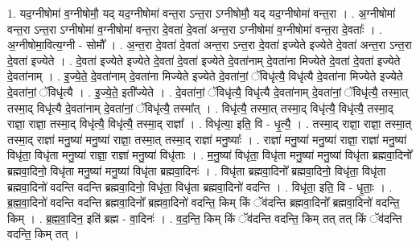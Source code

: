 \documentclass[17pt]{extarticle}
\begin{document}
1. यद॒ग्नीषोमा॑ व॒ग्नीषोमौ॒ यद् यद॒ग्नीषोमा॑ वन्त॒रा ऽन्त॒रा ऽग्नीषोमौ॒ यद् यद॒ग्नीषोमा॑ वन्त॒रा । . अ॒ग्नीषोमा॑ वन्त॒रा ऽन्त॒रा ऽग्नीषोमा॑ व॒ग्नीषोमा॑ वन्त॒रा दे॒वता॑ दे॒वता॑ अन्त॒रा ऽग्नीषोमा॑ व॒ग्नीषोमा॑ वन्त॒रा दे॒वताः᳚ । . अ॒ग्नीषोमा॒वित्य॒ग्नी - सोमौ᳚ । . अ॒न्त॒रा दे॒वता॑ दे॒वता॑ अन्त॒रा ऽन्त॒रा दे॒वता॑ इज्येते इज्येते दे॒वता॑ अन्त॒रा ऽन्त॒रा दे॒वता॑ इज्येते । . दे॒वता॑ इज्येते इज्येते दे॒वता॑ दे॒वता॑ इज्येते दे॒वता॑नाम् दे॒वता॑ना मिज्येते दे॒वता॑ दे॒वता॑ इज्येते दे॒वता॑नाम् । . इ॒ज्ये॒ते॒ दे॒वता॑नाम् दे॒वता॑ना मिज्येते इज्येते दे॒वता॑नां॒ ॅविधृ॑त्यै॒ विधृ॑त्यै दे॒वता॑ना मिज्येते इज्येते दे॒वता॑नां॒ ॅविधृ॑त्यै । . इ॒ज्ये॒ते॒ इती᳚ज्येते । . दे॒वता॑नां॒ ॅविधृ॑त्यै॒ विधृ॑त्यै दे॒वता॑नाम् दे॒वता॑नां॒ ॅविधृ॑त्यै॒ तस्मा॒त् तस्मा॒द् विधृ॑त्यै दे॒वता॑नाम् दे॒वता॑नां॒ ॅविधृ॑त्यै॒ तस्मा᳚त् । . विधृ॑त्यै॒ तस्मा॒त् तस्मा॒द् विधृ॑त्यै॒ विधृ॑त्यै॒ तस्मा॒द् राज्ञा॒ राज्ञा॒ तस्मा॒द् विधृ॑त्यै॒ विधृ॑त्यै॒ तस्मा॒द् राज्ञा᳚ । . विधृ॑त्या॒ इति॒ वि - धृ॒त्यै॒ । . तस्मा॒द् राज्ञा॒ राज्ञा॒ तस्मा॒त् तस्मा॒द् राज्ञा॑ मनु॒ष्या॑ मनु॒ष्या॑ राज्ञा॒ तस्मा॒त् तस्मा॒द् राज्ञा॑ मनु॒ष्याः᳚ । . राज्ञा॑ मनु॒ष्या॑ मनु॒ष्या॑ राज्ञा॒ राज्ञा॑ मनु॒ष्या॑ विधृ॑ता॒ विधृ॑ता मनु॒ष्या॑ राज्ञा॒ राज्ञा॑ मनु॒ष्या॑ विधृ॑ताः । . म॒नु॒ष्या॑ विधृ॑ता॒ विधृ॑ता मनु॒ष्या॑ मनु॒ष्या॑ विधृ॑ता ब्रह्मवा॒दिनो᳚ ब्रह्मवा॒दिनो॒ विधृ॑ता मनु॒ष्या॑ मनु॒ष्या॑ विधृ॑ता ब्रह्मवा॒दिनः॑ । . विधृ॑ता ब्रह्मवा॒दिनो᳚ ब्रह्मवा॒दिनो॒ विधृ॑ता॒ विधृ॑ता ब्रह्मवा॒दिनो॑ वदन्ति वदन्ति ब्रह्मवा॒दिनो॒ विधृ॑ता॒ विधृ॑ता ब्रह्मवा॒दिनो॑ वदन्ति । . विधृ॑ता॒ इति॒ वि - धृ॒ताः॒ । . ब्र॒ह्म॒वा॒दिनो॑ वदन्ति वदन्ति ब्रह्मवा॒दिनो᳚ ब्रह्मवा॒दिनो॑ वदन्ति॒ किम् किं ॅव॑दन्ति ब्रह्मवा॒दिनो᳚ ब्रह्मवा॒दिनो॑ वदन्ति॒ किम् । . ब्र॒ह्म॒वा॒दिन॒ इति॑ ब्रह्म - वा॒दिनः॑ । . व॒द॒न्ति॒ किम् किं ॅव॑दन्ति वदन्ति॒ किम् तत् तत् किं ॅव॑दन्ति वदन्ति॒ किम् तत् । \newline
\end{document}
